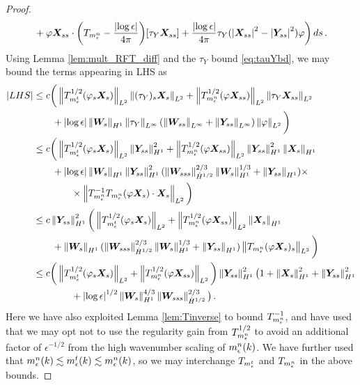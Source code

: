 \documentclass[10pt,a4paper]{amsart}
\newcommand{\X}{\bm{X}}
\newcommand{\Y}{\bm{Y}}
\newcommand{\abs}[1]{\left\lvert #1 \right\rvert}
\newcommand{\norm}[1]{\left\lVert #1 \right\rVert}
\begin{document}
\begin{proof}
\begin{equation}
\begin{aligned}
  &\quad+ \varphi\X_{ss}\cdot\bigg(T_{m_\epsilon^{\rm n}} -\frac{\abs{\log\epsilon}}{4\pi}\bigg)[\tau_Y\X_{ss}]  + \frac{\abs{\log\epsilon}}{4\pi}\tau_Y(\abs{\X_{ss}}^2-\abs{\Y_{ss}}^2)\varphi \bigg)\,ds \,.
\end{aligned}
\end{equation}
%
%
Using Lemma \ref{lem:mult_RFT_diff} and the $\tau_Y$ bound \eqref{eq:tauYbd}, we may bound the terms appearing in LHS as 
\begin{equation}\label{eq:LHS_diffbd}
\begin{aligned}
  \abs{{\rm LHS}} &\le c\bigg( \norm{T_{m_\epsilon^{\rm t}}^{1/2}(\varphi_s\X_s)}_{L^2}\norm{(\tau_Y)_s\X_s}_{L^2} + 
  \norm{T_{m_\epsilon^{\rm n}}^{1/2}(\varphi\X_{ss})}_{L^2}\norm{\tau_Y\X_{ss}}_{L^2}\\
  &\qquad + \abs{\log\epsilon}\norm{\bm{W}_s}_{H^1}\norm{\tau_Y}_{L^\infty}(\norm{\bm{W}_{ss}}_{L^\infty}+\norm{\Y_{ss}}_{L^\infty})\norm{\varphi}_{L^2} \bigg) \\
  &\le c\bigg( \norm{T_{m_\epsilon^{\rm t}}^{1/2}(\varphi_s\X_s)}_{L^2}\norm{\Y_{ss}}_{H^1}^2 + 
  \norm{T_{m_\epsilon^{\rm n}}^{1/2}(\varphi\X_{ss})}_{L^2}\norm{\Y_{ss}}_{H^1}^2\norm{\X_s}_{H^1}\\
  &\qquad + \abs{\log\epsilon}\norm{\bm{W}_s}_{H^1}\norm{\Y_{ss}}_{H^1}^2(\norm{\bm{W}_{sss}}_{\dot H^{1/2}}^{2/3}\norm{\bm{W}_s}_{H^1}^{1/3}+\norm{\Y_{ss}}_{H^1})\times\\
  &\qquad\qquad\times\norm{T_{m_\epsilon^{\rm n}}^{-1}T_{m_\epsilon^{\rm n}}(\varphi \X_s)\cdot\X_s}_{L^2} \bigg)  \\
  &\le c\norm{\Y_{ss}}_{H^1}^2\bigg( \norm{T_{m_\epsilon^{\rm t}}^{1/2}(\varphi_s\X_s)}_{L^2} + 
  \norm{T_{m_\epsilon^{\rm n}}^{1/2}(\varphi\X_{ss})}_{L^2}\norm{\X_s}_{H^1}\\
  &\qquad + \norm{\bm{W}_s}_{H^1}(\norm{\bm{W}_{sss}}_{\dot H^{1/2}}^{2/3}\norm{\bm{W}_s}_{H^1}^{1/3}+\norm{\Y_{ss}}_{H^1})\norm{T_{m_\epsilon^{\rm n}}(\varphi \X_s)_s}_{L^2} \bigg) \\
  &\le c\bigg( \norm{T_{m_\epsilon^{\rm t}}^{1/2}(\varphi_s\X_s)}_{L^2} + 
  \norm{T_{m_\epsilon^{\rm n}}^{1/2}(\varphi\X_{ss})}_{L^2}\bigg)\norm{\Y_{ss}}_{H^1}^2\big(1 + \norm{\X_s}_{H^1}^2 + \norm{\Y_{ss}}_{H^1}^2 \\
  &\qquad\qquad + \abs{\log\epsilon}^{1/2}\norm{\bm{W}_s}_{H^1}^{4/3}\norm{\bm{W}_{sss}}_{\dot H^{1/2}}^{2/3}\big)\,.
\end{aligned}
\end{equation}
Here we have also exploited Lemma \ref{lem:Tinverse} to bound $T_{m_\epsilon^{\rm n}}^{-1}$, and have used that we may opt not to use the regularity gain from $T_{m_\epsilon^{\rm n}}^{1/2}$ to avoid an additional factor of $\epsilon^{-1/2}$ from the high wavenumber scaling of $m_\epsilon^{\rm n}(k)$. We have further used that $m_\epsilon^{\rm n}(k)\lesssim m_\epsilon^{\rm t}(k)\lesssim m_\epsilon^{\rm n}(k)$, so we may interchange $T_{m_\epsilon^{\rm t}}$ and $T_{m_\epsilon^{\rm n}}$ in the above bounds. 




\end{proof}
\end{document}
